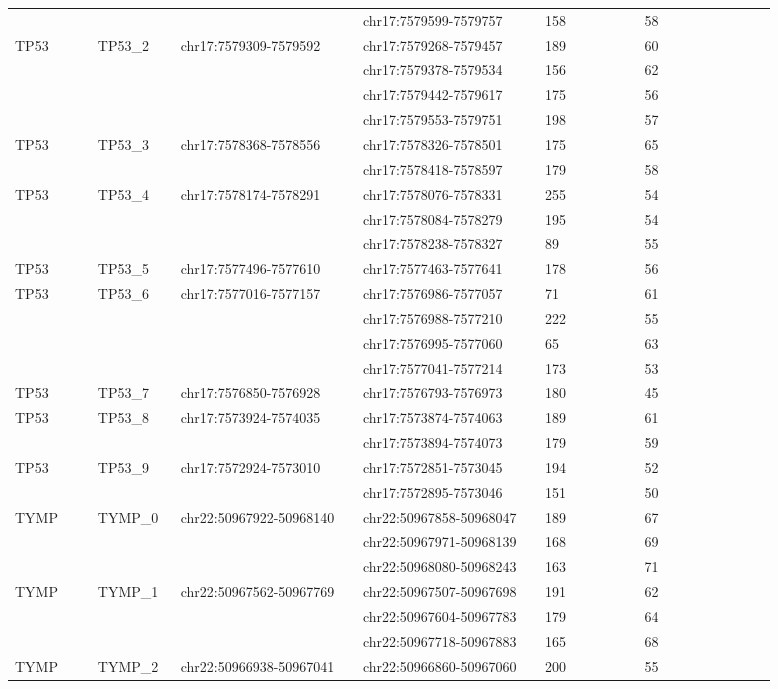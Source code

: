 \begin{landscape}
\begin{longtable}{p{0.1\linewidth}|p{0.1\linewidth}p{0.22\linewidth}p{0.22\linewidth}p{0.12\linewidth}p{0.16\linewidth}}
\\
 & & & chr17:7579599-7579757 & 158 & 58
\\
TP53 & TP53\_2 & chr17:7579309-7579592 & chr17:7579268-7579457 & 189 & 60
\\
 & & & chr17:7579378-7579534 & 156 & 62
\\
 & & & chr17:7579442-7579617 & 175 & 56
\\
 & & & chr17:7579553-7579751 & 198 & 57
\\
TP53 & TP53\_3 & chr17:7578368-7578556 & chr17:7578326-7578501 & 175 & 65
\\
 & & & chr17:7578418-7578597 & 179 & 58
\\
TP53 & TP53\_4 & chr17:7578174-7578291 & chr17:7578076-7578331 & 255 & 54
\\
 & & & chr17:7578084-7578279 & 195 & 54
\\
 & & & chr17:7578238-7578327 & 89 & 55
\\
TP53 & TP53\_5 & chr17:7577496-7577610 & chr17:7577463-7577641 & 178 & 56
\\
TP53 & TP53\_6 & chr17:7577016-7577157 & chr17:7576986-7577057 & 71 & 61
\\
 & & & chr17:7576988-7577210 & 222 & 55
\\
 & & & chr17:7576995-7577060 & 65 & 63
\\
 & & & chr17:7577041-7577214 & 173 & 53
\\
TP53 & TP53\_7 & chr17:7576850-7576928 & chr17:7576793-7576973 & 180 & 45
\\
TP53 & TP53\_8 & chr17:7573924-7574035 & chr17:7573874-7574063 & 189 & 61
\\
 & & & chr17:7573894-7574073 & 179 & 59
\\
TP53 & TP53\_9 & chr17:7572924-7573010 & chr17:7572851-7573045 & 194 & 52
\\
 & & & chr17:7572895-7573046 & 151 & 50
\\
\hline
TYMP & TYMP\_0 & chr22:50967922-50968140 & chr22:50967858-50968047 & 189 & 67
\\
 & & & chr22:50967971-50968139 & 168 & 69
\\
 & & & chr22:50968080-50968243 & 163 & 71
\\
TYMP & TYMP\_1 & chr22:50967562-50967769 & chr22:50967507-50967698 & 191 & 62
\\
 & & & chr22:50967604-50967783 & 179 & 64
\\
 & & & chr22:50967718-50967883 & 165 & 68
\\
TYMP & TYMP\_2 & chr22:50966938-50967041 & chr22:50966860-50967060 & 200 & 55

\end{longtable}
\end{landscape}
